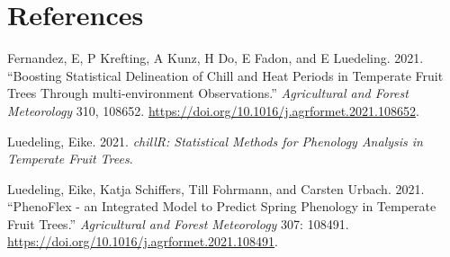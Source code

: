 \documentclass[
]{article}
\newlength{\cslhangindent}
\newlength{\cslentryspacingunit} %
\newenvironment{CSLReferences}[2] %
 {%
  \setlength{\parindent}{0pt}
  \ifodd #1
  \let\oldpar\par
  \def\par{\hangindent=\cslhangindent\oldpar}
  \fi
  \setlength{\parskip}{#2\cslentryspacingunit}
 }%
 {}
\begin{document}
\newpage

\hypertarget{references}{%
\section*{References}\label{references}}

\hypertarget{refs}{}
\begin{CSLReferences}{1}{0}
\leavevmode{}%
Fernandez, E, P Krefting, A Kunz, H Do, E Fadon, and E Luedeling. 2021.
{``Boosting Statistical Delineation of Chill and Heat Periods in
Temperate Fruit Trees Through {multi-environment} Observations.''}
\emph{Agricultural and Forest Meteorology} 310, 108652.
\url{https://doi.org/10.1016/j.agrformet.2021.108652}.

\leavevmode{}%
Luedeling, Eike. 2021. \emph{chillR: Statistical Methods for Phenology
Analysis in Temperate Fruit Trees}.

\leavevmode{}%
Luedeling, Eike, Katja Schiffers, Till Fohrmann, and Carsten Urbach.
2021. {``PhenoFlex - an Integrated Model to Predict Spring Phenology in
Temperate Fruit Trees.''} \emph{Agricultural and Forest Meteorology}
307: 108491. \url{https://doi.org/10.1016/j.agrformet.2021.108491}.

\end{CSLReferences}
\end{document}
